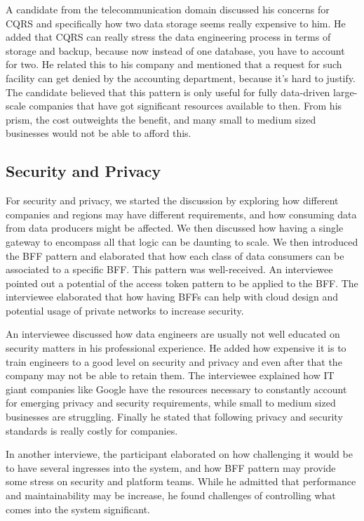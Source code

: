 \documentclass{bmcart}
\begin{document}
A candidate from the telecommunication domain discussed his concerns for CQRS and specifically how two data storage seems really expensive to him. He added that CQRS can really stress the data engineering process in terms of storage and backup, because now instead of one database, you have to account for two. He related this to his company and mentioned that a request for such facility can get denied by the accounting department, because it's hard to justify. The candidate believed that this pattern is only useful for fully data-driven large-scale companies that have got significant resources available to then. From his prism, the cost outweights the benefit, and many small to medium sized businesses would not be able to afford this. 


\subsection{Security and Privacy}

For security and privacy, we started the discussion by exploring how different companies and regions may have different requirements, and how consuming data from data producers might be affected. We then discussed how having a single gateway to encompass all that logic can be daunting to scale. We then introduced the BFF pattern and elaborated that how each class of data consumers can be associated to a specific BFF. This pattern was well-received. An interviewee pointed out a potential of the access token pattern to be applied to the BFF. The interviewee elaborated that how having BFFs can help with cloud design and potential usage of private networks to increase security. 

An interviewee discussed how data engineers are usually not well educated on security matters in his professional experience. He added how expensive it is to train engineers to a good level on security and privacy and even after that the company may not be able to retain them. The interviewee explained how IT giant companies like Google have the resources necessary to constantly account for emerging privacy and security requirements, while small to medium sized businesses are struggling. Finally he stated that following privacy and security standards is really costly for companies.

In another interviewe, the participant elaborated on how challenging it would be to have several ingresses into the system, and how BFF pattern may provide some stress on security and platform teams. While he admitted that performance and maintainability may be increase, he found challenges of controlling what comes into the system significant. 
\end{document}
